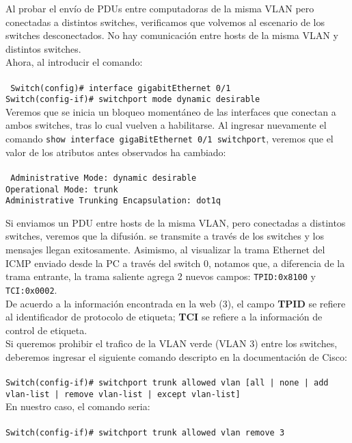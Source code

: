 \documentclass{article}
\begin{document}
Al probar el envío de PDUs entre computadoras de la misma VLAN pero conectadas a distintos switches, verificamos que volvemos al escenario de los switches desconectados. No hay comunicación entre hosts de la misma VLAN y distintos switches. \\

Ahora, al introducir el comando: \\\\
\texttt{
        Switch(config)\# interface gigabitEthernet 0/1 \\
	Switch(config-if)\# switchport mode dynamic desirable
} \\

Veremos que se inicia un bloqueo momentáneo de las interfaces que conectan a ambos switches, tras lo cual vuelven a habilitarse. Al ingresar nuevamente el comando \texttt{show interface gigaBitEthernet 0/1 switchport}, veremos que el valor de los atributos antes observados ha cambiado: \\\\
\texttt{
    Administrative Mode: dynamic desirable \\
    Operational Mode: trunk \\
    Administrative Trunking Encapsulation: dot1q \\
}

Si enviamos un PDU entre hosts de la misma VLAN, pero conectadas a distintos switches, veremos que la difusión. se transmite a través de los switches y los mensajes llegan exitosamente. Asimismo, al visualizar la trama Ethernet del ICMP enviado desde la PC a través del switch 0, notamos que, a diferencia de la trama entrante, la trama saliente agrega 2 nuevos campos: \texttt{TPID:0x8100} y \texttt{TCI:0x0002}. \\

De acuerdo a la información encontrada en la web (3), el campo \textbf{TPID} se refiere al identificador de protocolo de etiqueta; \textbf{TCI} se refiere a la información de control de etiqueta. \\

Si queremos prohibir el trafico de la VLAN verde (VLAN 3) entre los switches, deberemos ingresar el siguiente comando descripto en la documentación de Cisco: \\\\
\texttt{Switch(config-if)\# switchport trunk allowed vlan [all | none | add vlan-list | remove vlan-list | except vlan-list]} \\

En nuestro caso, el comando seria: \\\\
\texttt{Switch(config-if)\# switchport trunk allowed vlan remove 3} \\
\end{document}
